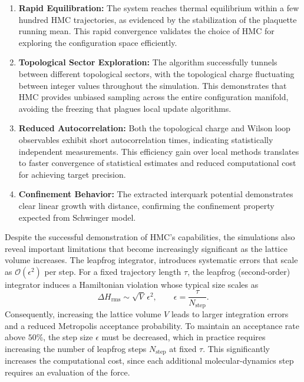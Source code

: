 \begin{enumerate}
    \item \textbf{Rapid Equilibration:} The system reaches thermal equilibrium within a few hundred HMC trajectories, as evidenced by the stabilization of the plaquette running mean. This rapid convergence validates the choice of HMC for exploring the configuration space efficiently.
    
    \item \textbf{Topological Sector Exploration:} The algorithm successfully tunnels between different topological sectors, with the topological charge fluctuating between integer values throughout the simulation. This demonstrates that HMC provides unbiased sampling across the entire configuration manifold, avoiding the freezing that plagues local update algorithms.
    
    \item \textbf{Reduced Autocorrelation:} Both the topological charge and Wilson loop observables exhibit short autocorrelation times, indicating statistically independent measurements. This efficiency gain over local methods translates to faster convergence of statistical estimates and reduced computational cost for achieving target precision.
    
    \item \textbf{Confinement Behavior:} The extracted interquark potential demonstrates clear linear growth with distance, confirming the confinement property expected from Schwinger model. 
\end{enumerate}


Despite the successful demonstration of HMC's capabilities, the simulations also reveal important limitations that become increasingly significant as the lattice volume increases.
The leapfrog integrator, introduces systematic errors that scale as $\mathcal{O}(\epsilon^2)$ per step. 
For a fixed trajectory length $\tau$, the leapfrog (second-order) integrator
induces a Hamiltonian violation whose typical size scales as
\begin{equation}
\Delta H_{\mathrm{rms}} \sim \sqrt{V}\,\epsilon^{2},
\qquad
\epsilon = \frac{\tau}{N_{\text{step}}}.
\end{equation}
Consequently, increasing the lattice volume $V$ leads to larger integration
errors and a reduced Metropolis acceptance probability.
To maintain an acceptance rate above $50\%$, the step size $\epsilon$ must be
decreased, which in practice requires increasing the number of leapfrog steps
$N_{\text{step}}$ at fixed $\tau$.
This significantly increases the computational cost, since each additional
molecular-dynamics step requires an evaluation of the  force.